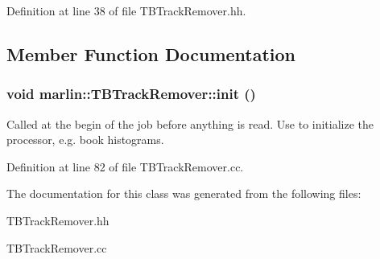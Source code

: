 Definition at line 38 of file TBTrackRemover.hh.

\subsection{Member Function Documentation}
\subsubsection[{init}]{\setlength{\rightskip}{0pt plus 5cm}void marlin::TBTrackRemover::init ()\hspace{0.3cm}{\ttfamily  [virtual]}}\label{classmarlin_1_1TBTrackRemover_a48e9f5ce74d8a9798a533dd276c988c0}


Called at the begin of the job before anything is read. Use to initialize the processor, e.g. book histograms. 

Definition at line 82 of file TBTrackRemover.cc.

The documentation for this class was generated from the following files:\begin{DoxyCompactItemize}
\item 
TBTrackRemover.hh\item 
TBTrackRemover.cc\end{DoxyCompactItemize}
